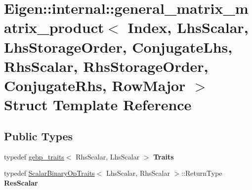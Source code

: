 \hypertarget{struct_eigen_1_1internal_1_1general__matrix__matrix__product_3_01_index_00_01_lhs_scalar_00_01_l7e45e4188e95a69de1c658ab4a83c882}{}\section{Eigen\+::internal\+::general\+\_\+matrix\+\_\+matrix\+\_\+product$<$ Index, Lhs\+Scalar, Lhs\+Storage\+Order, Conjugate\+Lhs, Rhs\+Scalar, Rhs\+Storage\+Order, Conjugate\+Rhs, Row\+Major $>$ Struct Template Reference}
\label{struct_eigen_1_1internal_1_1general__matrix__matrix__product_3_01_index_00_01_lhs_scalar_00_01_l7e45e4188e95a69de1c658ab4a83c882}
\subsection*{Public Types}
\begin{DoxyCompactItemize}
\item 
\mbox{\label{struct_eigen_1_1internal_1_1general__matrix__matrix__product_3_01_index_00_01_lhs_scalar_00_01_l7e45e4188e95a69de1c658ab4a83c882_a3da0035cd3d5cb4479e87167ea63a896}} 
typedef \mbox{\hyperlink{class_eigen_1_1internal_1_1gebp__traits}{gebp\+\_\+traits}}$<$ Rhs\+Scalar, Lhs\+Scalar $>$ {\bfseries Traits}
\item 
\mbox{\label{struct_eigen_1_1internal_1_1general__matrix__matrix__product_3_01_index_00_01_lhs_scalar_00_01_l7e45e4188e95a69de1c658ab4a83c882_a80a9e9a80857d02d9b23b891b4eca044}} 
typedef \mbox{\hyperlink{struct_eigen_1_1_scalar_binary_op_traits}{Scalar\+Binary\+Op\+Traits}}$<$ Lhs\+Scalar, Rhs\+Scalar $>$\+::Return\+Type {\bfseries Res\+Scalar}
\end{DoxyCompactItemize}
